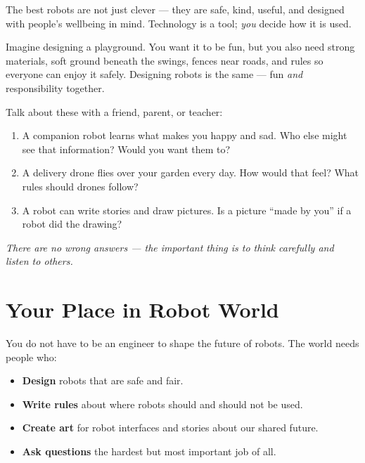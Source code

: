 \begin{bigidea}
  The best robots are not just clever --- they are safe, kind, useful,
  and designed with people's wellbeing in mind.
  Technology is a tool; \emph{you} decide how it is used.
\end{bigidea}

\begin{picturethis}
  Imagine designing a playground. You want it to be fun, but you also need
  strong materials, soft ground beneath the swings, fences near roads,
  and rules so everyone can enjoy it safely.
  Designing robots is the same --- fun \emph{and} responsibility together.
\end{picturethis}

\begin{tcolorbox}[enhanced,colback=RoboGreen!8,colframe=RoboGreen!70!black,arc=6pt,boxrule=1pt,
  fonttitle=\bfseries\large, title={\faComments\quad Think and Talk}]
  Talk about these with a friend, parent, or teacher:
  \begin{enumerate}[label=\textbf{\arabic*.}]
    \item A companion robot learns what makes you happy and sad.
          Who else might see that information? Would you want them to?
    \item A delivery drone flies over your garden every day.
          How would that feel? What rules should drones follow?
    \item A robot can write stories and draw pictures.
          Is a picture ``made by you'' if a robot did the drawing?
  \end{enumerate}
  \emph{There are no wrong answers --- the important thing is to think carefully and listen to others.}
\end{tcolorbox}

\sectionrule

\section*{Your Place in Robot World}

You do not have to be an engineer to shape the future of robots.
The world needs people who:
\begin{itemize}
  \item \textbf{Design} robots that are safe and fair.
  \item \textbf{Write rules} about where robots should and should not be used.
  \item \textbf{Create art} for robot interfaces and stories about our shared future.
  \item \textbf{Ask questions} \textemdash{} the hardest but most important job of all.
\end{itemize}

